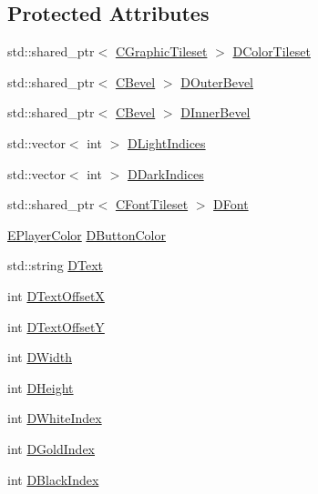 \subsection*{Protected Attributes}
\begin{DoxyCompactItemize}
\item 
std\+::shared\+\_\+ptr$<$ \hyperlink{classCGraphicTileset}{C\+Graphic\+Tileset} $>$ \hyperlink{classCButtonRenderer_aa823ae99f3642927241c085963888128}{D\+Color\+Tileset}
\item 
std\+::shared\+\_\+ptr$<$ \hyperlink{classCBevel}{C\+Bevel} $>$ \hyperlink{classCButtonRenderer_a6b0a352b22395934e0483569d2757a48}{D\+Outer\+Bevel}
\item 
std\+::shared\+\_\+ptr$<$ \hyperlink{classCBevel}{C\+Bevel} $>$ \hyperlink{classCButtonRenderer_ab3c6dd552abb11fe7cd9db5d71648afb}{D\+Inner\+Bevel}
\item 
std\+::vector$<$ int $>$ \hyperlink{classCButtonRenderer_a3f72c8f3b860fbaf43a372f112c11156}{D\+Light\+Indices}
\item 
std\+::vector$<$ int $>$ \hyperlink{classCButtonRenderer_a0f0723933f4800dcded7a4d180a87831}{D\+Dark\+Indices}
\item 
std\+::shared\+\_\+ptr$<$ \hyperlink{classCFontTileset}{C\+Font\+Tileset} $>$ \hyperlink{classCButtonRenderer_adcdace35cb4fac1c90368b7cc86d860a}{D\+Font}
\item 
\hyperlink{GameDataTypes_8h_aafb0ca75933357ff28a6d7efbdd7602f}{E\+Player\+Color} \hyperlink{classCButtonRenderer_a8b2bce7400657eb1a8f896b070d11996}{D\+Button\+Color}
\item 
std\+::string \hyperlink{classCButtonRenderer_a8f058166dec8d1c73adc009e4c436092}{D\+Text}
\item 
int \hyperlink{classCButtonRenderer_aaeb649ff53e0032e756c53b2f51f3d96}{D\+Text\+OffsetX}
\item 
int \hyperlink{classCButtonRenderer_a3922fa80775b693fd83e4d5e9f518b23}{D\+Text\+OffsetY}
\item 
int \hyperlink{classCButtonRenderer_a5c2ce68af06e91c14cbd1b8dd8bd4b94}{D\+Width}
\item 
int \hyperlink{classCButtonRenderer_a7e3d605b90c45d87ac1396c23c90b250}{D\+Height}
\item 
int \hyperlink{classCButtonRenderer_a931258275773c59f73b769ec0574b615}{D\+White\+Index}
\item 
int \hyperlink{classCButtonRenderer_aba9e3360876958aad5eb83c66b2c4ae5}{D\+Gold\+Index}
\item 
int \hyperlink{classCButtonRenderer_ac5306adba14177b75998e4ffc79a7295}{D\+Black\+Index}
\end{DoxyCompactItemize}


